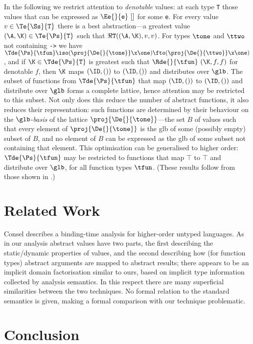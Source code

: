 In the following we restrict attention to {\it denotable\/} values:  at
each type \mbox{\tt T} those values that can be expressed as $\Ee{}{\mbox{\tt e}}~[]$ for
some \mbox{\tt e}.  For every value $v\in\Te{\Ss}{\mbox{\tt T}}$ there is a best
abstraction---a greatest value $(\A,\K)\in\Te{\Ps}{\mbox{\tt T}}$ such that
$\Re{}{\mbox{\tt T}}((\A,\K),v,v)$.  For types $\tone$ and $\ttwo$ not
containing \mbox{\tt ->} we have
$\Tde{\Ps}{\tfun}\iso(\proj{\De{}{\tone}}\x\one)\fto(\proj{\De{}{\ttwo}}\x\one)$,
and if $\K\in\Tde{\Ps}{\mbox{\tt T}}$ is greatest such that
$\Rde{}{\tfun}~(\K,f,f)$ for denotable $f$, then $\K$ maps $(\ID,())$
to $(\ID,())$ and distributes over $\glb$.  The subset of functions
from $\Tde{\Ps}{\tfun}$ that map $(\ID,())$ to $(\ID,())$ and
distribute over $\glb$ forms a complete lattice, hence attention may be
restricted to this subset.  Not only does this reduce the number of
abstract functions, it also reduces their representation:  such
functions are determined by their behaviour on the $\glb$-{\it basis\/}
of the lattice $\proj{\De{}{\tone}}$---the set $B$ of values such that
every element of $\proj{\De{}{\tone}}$ is the glb of some (possibly
empty) subset of $B$, and no element of $B$ can be expressed as the glb
of some subset not containing that element.  This optimisation can be
generalised to higher order:  $\Tde{\Ps}{\tfun}$ may be restricted to
functions that map $\top$ to $\top$ and distribute over $\glb$, for all
function types $\tfun$.  (These results follow from those shown in
\cite{Dav94}.)

\section{Related Work}

Consel \cite{Con90} describes a binding-time analysis for higher-order
untyped languages.  As in our analysis abstract values have two parts,
the first describing the static/dynamic properties of values, and the
second describing how (for function types) abstract arguments are
mapped to abstract results; there appears to be an implicit domain
factorisation similar to ours, based on implicit type information
collected by analysis semantics.  In this respect there are many
superficial similarities between the two techniques.  No formal
relation to the standard semantics is given, making a formal comparison
with our technique problematic.

\section{Conclusion}

